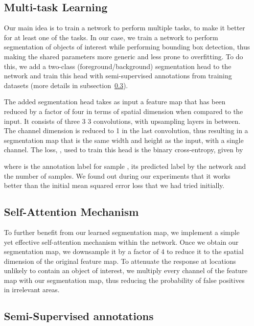 \documentclass[10pt, conference, compsocconf]{IEEEtran}
\begin{document}
\subsection{Multi-task Learning}

Our main idea is to train a network to perform multiple tasks, to make it better for at least one of the tasks. In our case, we train a network to perform segmentation of objects of interest while performing bounding box detection, thus making the shared parameters more generic and less prone to overfitting. To do this, we add a two-class (foreground/background) segmentation head to the network and train this head with semi-supervised annotations from training datasets (more details in subsection~\ref{subsec:annot}).  

The added segmentation head takes as input a feature map that has been reduced by a factor of four in terms of spatial dimension when compared to the input. It consists of three 3  3 convolutions, with upsampling layers in between. The channel dimension is reduced to 1 in the last convolution, thus resulting in a segmentation map that is the same width and height as the input, with a single channel. The loss, , used to train this head is the binary cross-entropy, given by



where  is the annotation label for sample ,   its predicted label by the network and  the number of samples. We found out during our experiments that it works better than the initial mean squared error loss that we had tried initially.  

\subsection{Self-Attention Mechanism}

To further benefit from our learned segmentation map, we implement a simple yet effective self-attention mechanism within the network. Once we obtain our segmentation map, we downsample it by a factor of 4 to reduce it to the spatial dimension of the original feature map. To attenuate the response at locations unlikely to contain an object of interest, we multiply every channel of the feature map with our segmentation map, thus reducing the probability of false positives in irrelevant areas. 

\subsection{Semi-Supervised annotations}
\label{subsec:annot}
\end{document}
